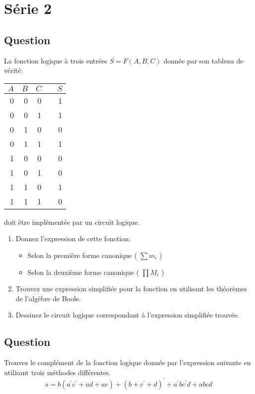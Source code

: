\documentclass[letter, oneside]{book}
\begin{document}
\chapter*{Série 2}
\label{sec:org787062c}
\section*{Question}
\label{sec:org58b160b}
La fonction logique à trois entrées \(S = F(A,B,C)\) donnée par son 
   tableau de vérité:
\begin{center}
\begin{tabular}{rrrlr}
\(A\) & \(B\) & \(C\) &  & \(S\)\\[0pt]
\hline
0 & 0 & 0 &  & 1\\[0pt]
0 & 0 & 1 &  & 1\\[0pt]
0 & 1 & 0 &  & 0\\[0pt]
0 & 1 & 1 &  & 1\\[0pt]
1 & 0 & 0 &  & 0\\[0pt]
1 & 0 & 1 &  & 0\\[0pt]
1 & 1 & 0 &  & 1\\[0pt]
1 & 1 & 1 &  & 0\\[0pt]
\end{tabular}
\end{center}

doit être implémentée par un circuit logique.

\begin{enumerate}
\item Donnez l'expression de cette fonction:

\begin{itemize}
\item Selon la première forme canonique ( \(\sum m_i\) )

\item Selon la deuxième forme canonique ( \(\prod M_i\) )
\end{itemize}

\item Trouvez une expression simplifiée pour la fonction en utilisant
les théorèmes de l'algèbre de Boole.

\item Dessinez le circuit logique correspondant à l'expression
simplifiée trouvée.
\end{enumerate}

\section*{Question}
\label{sec:org5ca0eeb}
Trouvez le complément de la fonction logique donnée par l'expression
   suivante en utilisant trois méthodes différentes.
   $$
    s = b (a^{\prime} c^{\prime} + a d + a c) + (b + c^{\prime}+
      d)^{\prime} + a^{\prime} b c^{\prime} d + a b c d
    $$
\end{document}
